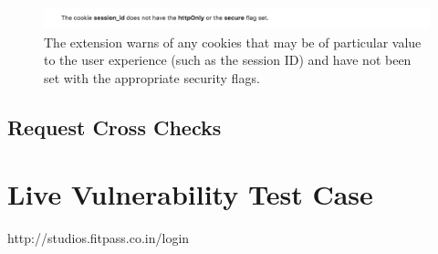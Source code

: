 \begin{figure}[h!]
	\centering
	\includegraphics[width=\textwidth]{images/cookie_warning.png}
	\caption{The extension warns of any cookies that may be of particular value to the user experience (such as the session ID) and have not been set with the appropriate security flags.}
	\label{fig:cookie_warning}
\end{figure}



\subsection{Request Cross Checks}



\section{Live Vulnerability Test Case}

http://studios.fitpass.co.in/login






















